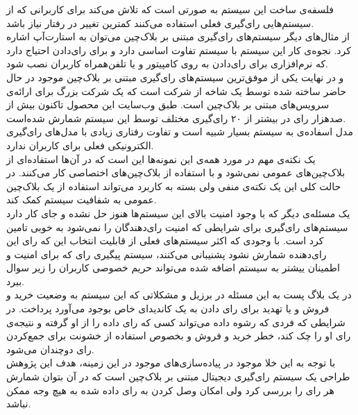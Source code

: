 فلسفه‌ی ساخت این سیستم به صورتی است که تلاش می‌کند برای کاربرانی که از سیستم‌هایی رای‌گیری فعلی استفاده می‌کنند کمترین تغییر در رفتار نیاز باشد. 
\\
از مثال‌های دیگر سیستم‌های رای‌گیری مبتنی بر بلاک‌چین می‌توان به استارت‌آپ 
اشاره کرد. نجوه‌ی کار این سیستم با سیستم 
تفاوت اساسی دارد و برای رای‌دادن احتیاج دارد که نرم‌‌افزاری برای رای‌دادن به روی کامپیتور و یا تلفن‌همراه کاربران نصب شود. 
\\
و در نهایت یکی از موفق‌ترین سیستم‌های رای‌گیری مبتنی بر بلاک‌چین موجود در حال حاضر 
ساخته شده توسط یک شاخه از شرکت 
است که یک شرکت بزرگ برای ارائه‌ی سرویس‌های مبتنی بر بلاک‌چین است. طبق وب‌سایت این محصول تاکنون بیش از صدهزار رای در بیشتر از ۲۰ رای‌گیری مختلف توسط این سیستم‌ شمارش شده‌است. 
\\
مدل اسفاده‌ی 
به سیستم‌ 
بسیار شبیه است و تفاوت رفتاری زیادی با مدل‌های رای‌گیری الکترونیکی فعلی برای کاربران ندارد. 
\\
یک نکته‌ی مهم در مورد همه‌ی این نمونه‌ها این است که در آن‌ها استفاده‌ای از بلاک‌چین‌های عمومی نمی‌شود و با استفاده از بلاک‌چین‌های اختصاصی کار می‌کنند. در حالت کلی این یک نکته‌ی منفی ولی بسته‌ به کاربرد می‌تواند استفاده‌ از یک بلاک‌چین عمومی به شفافیت سیستم کمک کند.
\\
یک مسئله‌ی دیگر که با وجود امنیت بالای این سیستم‌ها هنوز حل نشده و جای کار دارد سیستم‌های رای‌گیری برای شرایطی که امنیت رای‌دهندگان را نمی‌شود به خوبی تامین کرد است. با وجودی که اکثر سیستم‌های فعلی از قابلیت انتخاب این که رای این رای‌دهنده شمارش نشود پشنیبانی می‌کنند، سیستم پیگیری رای که برای امنیت و اطمینان ییشتر به سیستم اضافه شده می‌تواند حریم خصوصی کاربران را زیر سوال ببرد.
\\ 
در یک بلاگ پست به این مسئله در برزیل و مشکلاتی که این سیستم به وضعیت خرید و فروش و یا تهدید برای رای دادن به یک کاندیدای خاص بوجود می‌آورد پرداخت. در شرایطی که فردی که رشوه داده می‌تواند 
کسی که رای داده را از او گرفته و نتیجه‌ی رای او را چک کند، خطر خرید و فروش و بخصوص استفاده از خشونت برای جمع‌کردن رای دوچندان می‌شود. 
\\
با توجه به این خلا موجود در پیاده‌سازی‌های موجود در این زمینه، هدف این پژوهش طراحی یک سیستم رای‌گیری دیجیتال مبتنی بر بلاک‌چین است که در آن بتوان شمارش هر رای را بررسی کرد ولی امکان وصل کردن به رای داده شده به هیچ وجه ممکن نباشد. 






